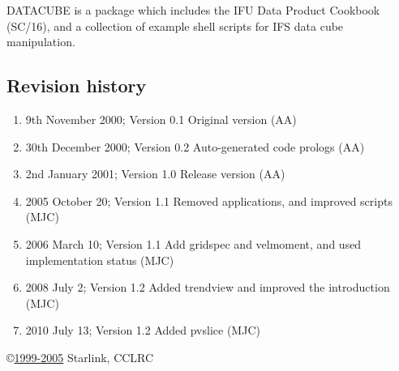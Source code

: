 \documentclass[twoside,11pt]{article}
\newcommand{\stardocinitials}  {SUN}
\newcommand{\stardocnumber}    {237.4}
\newcommand{\stardocabstract}  {
\htmlref{DATACUBE}{DATACUBE} is a package which includes the IFU Data Product Cookbook (\xref{SC/16}{sc16}{}), and a collection of example shell scripts for IFS data cube manipulation.
}
\newcommand{\stardocname}{\stardocinitials /\stardocnumber}
\newcommand{\htmlref}[2]{#1}
\newenvironment{latexonly}{}{}
\newcommand{\xref}[3]{#1}
\renewcommand{\_}{\texttt{\symbol{95}}}
\newcommand{\latexonlytoc}[0]{\tableofcontents}
\renewcommand{\thepage}{\roman{page}}
\begin{document}
\stardocabstract
 \newpage
 \vspace{3cm}

 \subsection*{Revision history}

 \begin{enumerate}
   \item 9th November 2000; Version 0.1 Original version (AA)
   \item 30th December 2000; Version 0.2 Auto-generated code prologs (AA)
   \item 2nd January 2001; Version 1.0 Release version (AA)
   \item 2005 October 20; Version 1.1 Removed applications, and improved scripts (MJC)
   \item 2006 March 10; Version 1.1 Add gridspec and velmoment, and
         used implementation status (MJC)
   \item 2008 July 2; Version 1.2 Added trendview and improved the introduction (MJC)
   \item 2010 July 13; Version 1.2 Added pvslice (MJC)

 \end{enumerate}

 \vspace{10cm}
 \copyright \underline{1999-2005} Starlink, CCLRC

 \cleardoublepage
 \begin{latexonly}
   \setlength{\parskip}{0mm}
   \latexonlytoc

   \newpage
   \listoffigures

   \setlength{\parskip}{\medskipamount}
   \markright{\stardocname}
 \end{latexonly}

\cleardoublepage
\newpage
\renewcommand{\thepage}{\arabic{page}}
\setcounter{page}{1}

\end{document}
